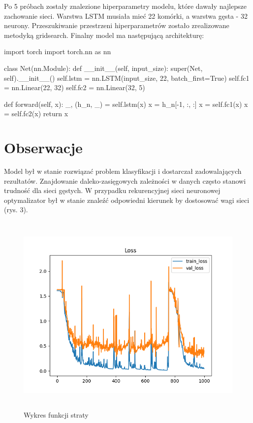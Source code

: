 \documentclass[10pt]{article}
\begin{document}
Po 5 próbach zostały znalezione hiperparametry modelu, które dawały najlepsze zachowanie sieci. Warstwa LSTM musiała mieć 22 komórki, a warstwa gęsta - 32 neurony. Przeszukiwanie przestrzeni hiperparametrów zostało zrealizowane metodyką gridsearch. Finalny model ma następującą architekturę:

\begin{python}
import torch
import torch.nn as nn

class Net(nn.Module):
  def __init__(self, input_size):
      super(Net, self).__init__()
      self.lstm = nn.LSTM(input_size, 22, batch_first=True)
      self.fc1 = nn.Linear(22, 32)
      self.fc2 = nn.Linear(32, 5)

  def forward(self, x):
      _, (h_n, _) = self.lstm(x)
      x = h_n[-1, :, :]
      x = self.fc1(x)
      x = self.fc2(x)
      return x
\end{python}


\section{Obserwacje}

Model był w stanie rozwiązać problem klasyfikacji i dostarczał zadowalających rezultatów. Znajdowanie daleko-zasięgowych zależności w danych często stanowi trudność dla sieci gęstych. W przypadku rekurencyjnej sieci neuronowej optymalizator był w stanie znaleźć odpowiedni kierunek by dostosować wagi sieci (rys. 3).


\begin{figure}[H]
  \includegraphics[height=10cm]{loss.png}
  \centering
  \caption{Wykres funkcji straty}
\end{figure}
\end{document}
